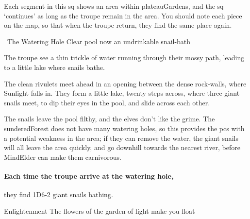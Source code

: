 \begin{multicols}{2}




Each \gls{segment} in this \gls{sq} shows an area within \gls{plateauGardens}, and the \gls{sq} `continues' as long as the troupe remain in the \gls{area}.
You should note each piece on the map, so that when the troupe return, they find the same place again.

{\squash~The Watering Hole}%
{Clear pool now an undrinkable snail-bath}%
\label{shadePool}

The troupe see a thin trickle of water running through their mossy path, leading to a little lake where snails bathe.

\begin{boxtext}
  The clean rivulets meet ahead in an opening between the dense rock-walls, where Sunlight falls in.
  They form a little lake, twenty \glspl{step} across, where three giant snails meet, to dip their eyes in the pool, and slide across each other.
\end{boxtext}

The snails leave the pool filthy, and the elves don't like the grime.
The \gls{sunderedForest} does not have many watering holes, so this provides the \glspl{pc} with a potential weakness in the area; if they can remove the  water, the giant snails will all leave the area quickly, and go downhill towards the nearest river, before \gls{MindElder} can make them carnivorous.

\paragraph{Each time the troupe arrive at the watering hole,}
they find 1D6-2 giant snails bathing.

{Enlightenment}%
{The flowers of the garden of light make you float}%
\label{lightFlowers}


\end{multicols}
